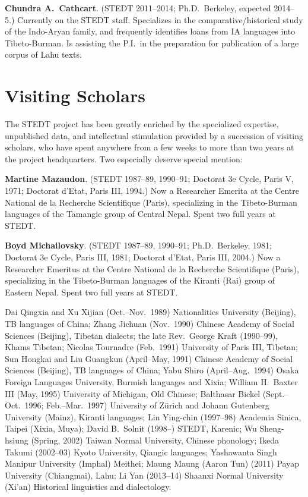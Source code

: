 \textbf{Chundra A.\ Cathcart}. (STEDT 2011–2014; Ph.D.\ Berkeley, expected 2014–5.) Currently on the STEDT staff. Specializes in the comparative/historical study of the Indo-Aryan family, and frequently identifies loans from IA languages into Tibeto-Burman. Is assisting the P.I.\ in the preparation for publication of a large corpus of Lahu texts.

\section{Visiting Scholars}

The STEDT project has been greatly enriched by the specialized expertise, unpublished data, and intellectual stimulation provided by a succession of visiting scholars, who have spent anywhere from a few weeks to more than two years at the project headquarters. Two especially deserve special mention:

\textbf{Martine Mazaudon}. (STEDT 1987–89, 1990–91; Doctorat 3e Cycle, Paris V, 1971; Doctorat d’Etat, Paris III, 1994.) Now a Researcher Emerita at the Centre National de la Recherche Scientifique (Paris), specializing in the Tibeto-Burman languages of the Tamangic group of Central Nepal. Spent two full years at STEDT.

\textbf{Boyd Michailovsky}. (STEDT 1987–89, 1990–91; Ph.D.\ Berkeley, 1981; Doctorat 3e Cycle, Paris III, 1981; Doctorat d’Etat, Paris III, 2004.) Now a Researcher Emeritus at the Centre National de la Recherche Scientifique (Paris), specializing in the Tibeto-Burman languages of the Kiranti (Rai) group of Eastern Nepal. Spent two full years at STEDT.

{\sc Dai} Qingxia and {\sc Xu} Xijian (Oct.–Nov.\ 1989) Nationalities University (Beijing), TB languages of China; {\sc Zhang} Jichuan (Nov.\ 1990) Chinese Academy of Social Sciences (Beijing), Tibetan dialects; the late Rev.\ George Kraft (1990–99), Khams Tibetan; Nicolas Tournadre (Feb.\ 1991) University of Paris III, Tibetan; {\sc Sun} Hongkai and {\sc Liu} Guangkun (April–May, 1991) Chinese Academy of Social Sciences (Beijing), TB languages of China; {\sc Yabu} Shiro (April–Aug.\ 1994) Osaka Foreign Languages University, Burmish languages and Xixia; William H.\ Baxter III (May, 1995) University of Michigan, Old Chinese; Balthasar Bickel (Sept.–Oct.\ 1996; Feb.–Mar.\ 1997) University of Z\"urich and Johann Gutenberg University (Mainz), Kiranti languages; {\sc Lin} Ying-chin (1997–98) Academia Sinica, Taipei (Xixia, Muya); David B.\ Solnit (1998–) STEDT, Karenic; {\sc Wu} Sheng-hsiung (Spring, 2002) Taiwan Normal University, Chinese phonology; {\sc Ikeda} Takumi (2002–03) Kyoto University, Qiangic languages; Yashawanta Singh  Manipur University (Imphal) Meithei; Maung Maung (Aaron Tun) (2011) Payap University (Chiangmai), Lahu; {\sc Li} Yan (2013–14) Shaanxi Normal University (Xi’an) Historical linguistics and dialectology.

